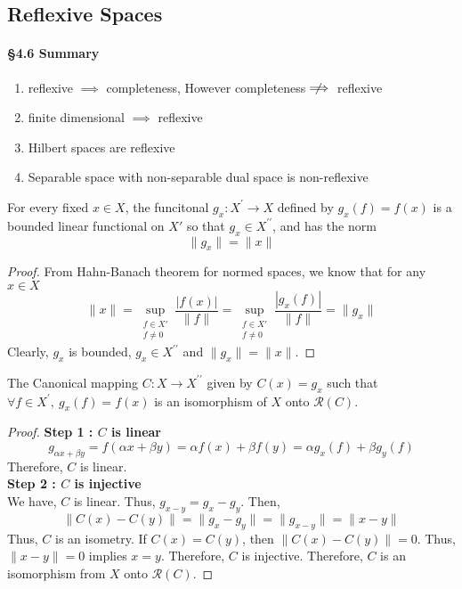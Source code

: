 \setcounter{subsection}{5}
\subsection{Reflexive Spaces}
\begin{commentary}
\paragraph{\S4.6 Summary}
\begin{enumerate}
	\item reflexive $\implies$ completeness, However completeness $\;\not\nobreak\!\!\!\!\implies$ reflexive
	\item finite dimensional $\implies$ reflexive
	\item Hilbert spaces are reflexive
	\item Separable space with non-separable dual space is non-reflexive
\end{enumerate}
\end{commentary}

\begin{lemma}
	For every fixed $x \in X$, the funcitonal $g_x : X^\prime \to X$ defined by $g_x(f) = f(x)$ is a bounded linear functional on $X'$ so that $g_x \in X^{\prime\prime}$, and has the norm
	\[ \|g_x\| = \|x\| \]
\end{lemma}
\begin{proof}
	From Hahn-Banach theorem for normed spaces, we know that for any $x \in X$
	\begin{equation}
		\|x\|  = \sup_{\substack{f \in X'\\ f \ne 0}} \frac{|f(x)|}{\|f\|}  =  \sup_{\substack{f \in X' \\ f \ne 0}} \frac{|g_x(f)|}{\|f\|} = \|g_x\| 
	\end{equation}
	Clearly, $g_x$ is bounded, $g_x \in X^{\prime\prime}$ and $\|g_x\| = \|x\|$.
\end{proof}

\begin{lemma}
	The Canonical mapping $C : X \to X^{\prime\prime}$ given by $C(x) = g_x$ such that $\forall f \in X^\prime,\ g_x(f) = f(x)$ is an isomorphism of $X$ onto $\mathscr{R}(C)$.
\end{lemma}
\begin{proof}
	\textbf{Step 1 : $C$ is linear}
	\begin{equation}
	g_{\alpha x + \beta y} = f(\alpha x + \beta y) = \alpha f(x) + \beta f(y) = \alpha g_x(f) + \beta g_y(f)
	\end{equation}
	\indent Therefore, $C$ is linear.\\

	\textbf{Step 2 : $C$ is injective}\\
	\indent We have, $C$ is linear.
	Thus, $g_{x-y} = g_x - g_y$.
	Then,
	\begin{equation}	
		\| C(x) - C(y) \| = \| g_x - g_y \| = \|g_{x-y}\| = \|x-y\|
	\end{equation}
	\indent Thus, $C$ is an isometry.
	If $C(x) = C(y)$, then $\|C(x) - C(y)\| = 0$.
	Thus, $\|x-y\| = 0$ implies $x = y$.
	Therefore, $C$ is injective.
	Therefore, $C$ is an isomorphism from $X$ onto $\mathscr{R}(C)$.
\end{proof}

